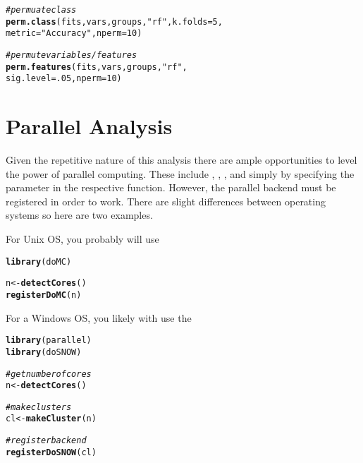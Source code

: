 \documentclass[12pt]{article}\usepackage[]{graphicx}\usepackage[usenames,dvipsnames]{color}
\makeatletter
\newcommand{\hlnum}[1]{\textcolor[rgb]{0.686,0.059,0.569}{#1}}%
\newcommand{\hlstr}[1]{\textcolor[rgb]{0.192,0.494,0.8}{#1}}%
\newcommand{\hlcom}[1]{\textcolor[rgb]{0.678,0.584,0.686}{\textit{#1}}}%
\newcommand{\hlstd}[1]{\textcolor[rgb]{0.345,0.345,0.345}{#1}}%
\newcommand{\hlkwb}[1]{\textcolor[rgb]{0.69,0.353,0.396}{#1}}%
\newcommand{\hlkwc}[1]{\textcolor[rgb]{0.333,0.667,0.333}{#1}}%
\newcommand{\hlkwd}[1]{\textcolor[rgb]{0.737,0.353,0.396}{\textbf{#1}}}%
\newenvironment{kframe}{%
 \def\at@end@of@kframe{}%
 \ifinner\ifhmode%
  \def\at@end@of@kframe{\end{minipage}}%
  \begin{minipage}{\columnwidth}%
 \fi\fi%
 \def\FrameCommand##1{\hskip\@totalleftmargin \hskip-\fboxsep
 \colorbox{shadecolor}{##1}\hskip-\fboxsep
     \hskip-\linewidth \hskip-\@totalleftmargin \hskip\columnwidth}%
 \MakeFramed {\advance\hsize-\width
   \@totalleftmargin\z@ \linewidth\hsize
   \@setminipage}}%
 {\par\unskip\endMakeFramed%
 \at@end@of@kframe}
\newenvironment{knitrout}{}{} %
\makeatother
\begin{document}
\begin{knitrout}
\color{fgcolor}\begin{kframe}
\begin{alltt}
\hlcom{# permuate class}
\hlkwd{perm.class}\hlstd{(fits, vars, groups,} \hlstr{"rf"}\hlstd{,} \hlkwc{k.folds}\hlstd{=}\hlnum{5}\hlstd{,}
           \hlkwc{metric}\hlstd{=}\hlstr{"Accuracy"}\hlstd{,} \hlkwc{nperm}\hlstd{=}\hlnum{10}\hlstd{)}


\hlcom{# permute variables/features}
\hlkwd{perm.features}\hlstd{(fits, vars, groups,} \hlstr{"rf"}\hlstd{,}
        \hlkwc{sig.level} \hlstd{=} \hlnum{.05}\hlstd{,} \hlkwc{nperm} \hlstd{=} \hlnum{10}\hlstd{)}
\end{alltt}
\end{kframe}
\end{knitrout}

\newpage
\section{Parallel Analysis}

Given the repetitive nature of this analysis there are ample opportunities to
level the power of parallel computing.  These include ,
, , and 
 simply by specifying the parameter 
 in the respective function. However, the parallel
backend must be registered in order to work. There are slight differences 
between operating systems so here are two examples.

For Unix OS, you probably will use 

\begin{knitrout}
\color{fgcolor}\begin{kframe}
\begin{alltt}
\hlkwd{library}\hlstd{(doMC)}

\hlstd{n} \hlkwb{<-} \hlkwd{detectCores}\hlstd{()}
\hlkwd{registerDoMC}\hlstd{(n)}
\end{alltt}
\end{kframe}
\end{knitrout}

For a Windows OS, you likely with use the 

\begin{knitrout}
\color{fgcolor}\begin{kframe}
\begin{alltt}
\hlkwd{library}\hlstd{(parallel)}
\hlkwd{library}\hlstd{(doSNOW)}

\hlcom{# get number of cores}
\hlstd{n} \hlkwb{<-} \hlkwd{detectCores}\hlstd{()}

\hlcom{# make clusters}
\hlstd{cl} \hlkwb{<-} \hlkwd{makeCluster}\hlstd{(n)}

\hlcom{# register backend}
\hlkwd{registerDoSNOW}\hlstd{(cl)}
\end{alltt}
\end{kframe}
\end{knitrout}
\end{document}
